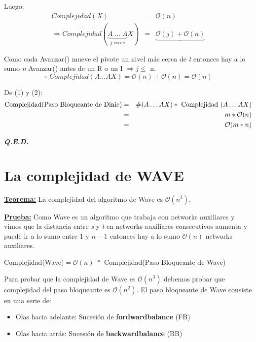 \documentclass[12pt,a4paper]{report}
\newcommand{\QED}{\hfill \textit{\textbf{Q.E.D.}}}
\begin{document}
\begin{enumerate}
					\par Luego:
					\begin{eqnarray}
						\nonumber Complejidad(X) &=& \mathcal{O}(n) \\
						\nonumber \Rightarrow Complejidad (\underbrace{A \; \dotsc \; A}_{j \; veces}X) &=& \underbrace{\mathcal{O}(j) + \mathcal{O}(n)}
					\end{eqnarray}

					\par Como cada Avanzar() mueve el pivote un nivel más cerca de \textit{t} entonces hay a lo sumo \textit{n} Avanzar() antes de un R o un I $\Rightarrow j\leq$ n.
					\[ \therefore \; Complejidad(A \dotsc AX) = \mathcal{O}(n) + \mathcal{O}(n) = \mathcal{O}(n)\]
			\end{enumerate}

			\par De (1) y (2):
			\begin{eqnarray}
				\nonumber \textup{Complejidad(Paso Bloqueante de Dinic)} &=& \# (A \dotsc A X) * \textup{ Complejidad } (A \dotsc A X) \\
				\nonumber &=& m * \mathcal{O}(n) \\
				\nonumber &=& \mathcal{O}(m*n)
			\end{eqnarray}

		\QED


	\section{La complejidad de WAVE}
		\textbf{\underline{Teorema:}} La complejidad del algoritmo de Wave es $\mathcal{O}(n^{3})$.

		\textbf{\underline{Prueba:}} Como Wave es un algoritmo que trabaja con networks auxiliares y vimos que la distancia entre \textit{s} y \textit{t} en networks auxiliares consecutivos aumenta y puede ir a lo sumo entre 1 y $n - 1$ entonces hay a lo sumo $\mathcal{O}(n)$ networks auxiliares.
			\begin{center}
				Complejidad(Wave)$ = \mathcal{O}(n) \; *$ Complejidad(Paso Bloqueante de Wave)
			\end{center}

			\par Para probar que la complejidad de Wave es $\mathcal{O}(n^{3})$ debemos probar que complejidad del paso bloqueante es $\mathcal{O}(n^{2})$. El paso bloqueante de Wave consiste en una serie de:
			\begin{itemize}
				\item Olas hacia adelante: Sucesión de \textbf{fordwardbalance} (FB)
				\item Olas hacia atrás: Sucesión de \textbf{backwardbalance} (BB)
			\end{itemize}
\end{document}
